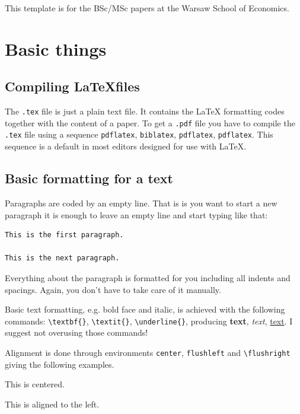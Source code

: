 \documentclass[english, twoside, 12pt, a4paper]{article}
\theoremstyle{definition}
\theoremstyle{plain}
\theoremstyle{remark}
\begin{document}
This template is for the BSc/MSc papers at the Warsaw School of Economics. 

\clearpage
\section{Basic things}

\subsection{Compiling \LaTeX files}

The \verb+.tex+ file is just a plain text file. It contains the \LaTeX{} formatting codes together with the content of a paper. To get a \verb+.pdf+ file you have to compile the \verb+.tex+ file using a sequence \verb+pdflatex+, \verb+biblatex+, \verb+pdflatex+, \verb+pdflatex+. This sequence is a default in most editors designed for use with \LaTeX.

\subsection{Basic formatting for a text}

Paragraphs are coded by an empty line. That is is you want to start a new paragraph it is enough to leave an empty line and start typing like that:
\begin{verbatim}
This is the first paragraph.

This is the next paragraph.
\end{verbatim}

Everything about the paragraph is formatted for you including all indents and spacings. Again, you don't have to take care of it manually.

Basic text formatting, e.g. bold face and italic, is achieved with the following commands: \verb+\textbf{}+, \verb+\textit{}+, \verb+\underline{}+, producing \textbf{text}, \textit{text}, \underline{text}. I suggest not overusing those commands!

Alignment is done through environments \verb+center+, \verb+flushleft+ and \verb+\flushright+ giving the following examples.

\begin{center}
  This is centered.
\end{center}

\begin{flushleft}
  This is aligned to the left.
\end{flushleft}
\end{document}

